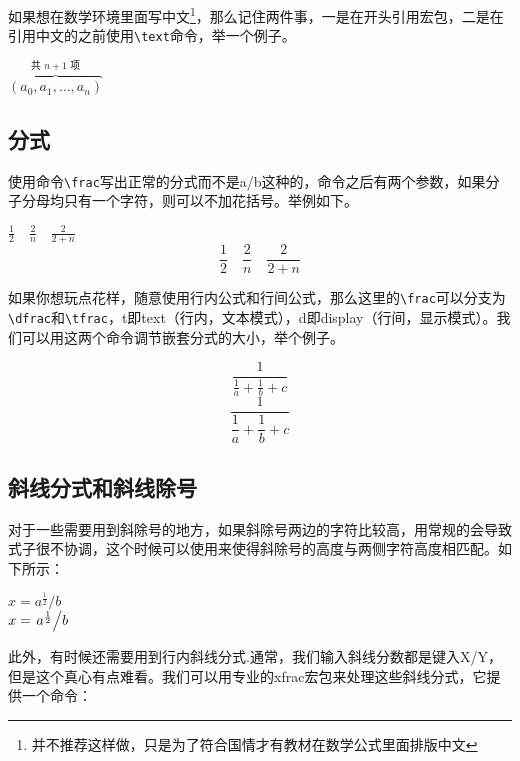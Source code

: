 如果想在数学环境里面写中文\footnote{并不推荐这样做，只是为了符合国情才有教材在数学公式里面排版中文}，那么记住两件事，一是在开头引用\CTeX 宏包，二是在引用中文的之前使用\lstinline|\text|命令，举一个例子。
\begin{codeshow}
$\overbrace{(a_0,a_1,\dots,a_n)}
^{\text{共 $n+1$ 项}}$
\end{codeshow}

\subsection{分式}
使用命令\lstinline|\frac|写出正常的分式而不是a/b这种的，命令之后有两个参数，如果分子分母均只有一个字符，则可以不加花括号。举例如下。
\begin{codeshow}
$\frac12 \quad \frac2n
\quad \frac{2}{2+n}$
\[ \frac12 \quad \frac2n
\quad \frac{2}{2+n} \]
\end{codeshow}

如果你想玩点花样，随意使用行内公式和行间公式，那么这里的\lstinline|\frac|可以分支为\lstinline|\dfrac|和\lstinline|\tfrac|，t即text（行内，文本模式），d即display（行间，显示模式）。我们可以用这两个命令调节嵌套分式的大小，举个例子。
\begin{codeshow}
\[ \frac{1}{\tfrac1a+\tfrac1b+c} \]
\[ \frac{1}{\dfrac1a+\dfrac1b+c} \]
\end{codeshow}

\subsection{斜线分式和斜线除号}

对于一些需要用到斜除号的地方，如果斜除号两边的字符比较高，用常规的\code{/}会导致式子很不协调，这个时候可以使用\code{\middle/}来使得斜除号的高度与两侧字符高度相匹配。如下所示：

\begin{codeshow}
$x=a^\frac{1}{2}/b$\\
$x=\left.a^\frac{1}{2}\middle/b\right.$
\end{codeshow}

此外，有时候还需要用到行内斜线分式.通常，我们输入斜线分数都是键入X/Y，但是这个真心有点难看。我们可以用专业的xfrac宏包来处理这些斜线分式，它提供一个命令：

\begin{latex}
\sfrac{}{}
\end{latex}


